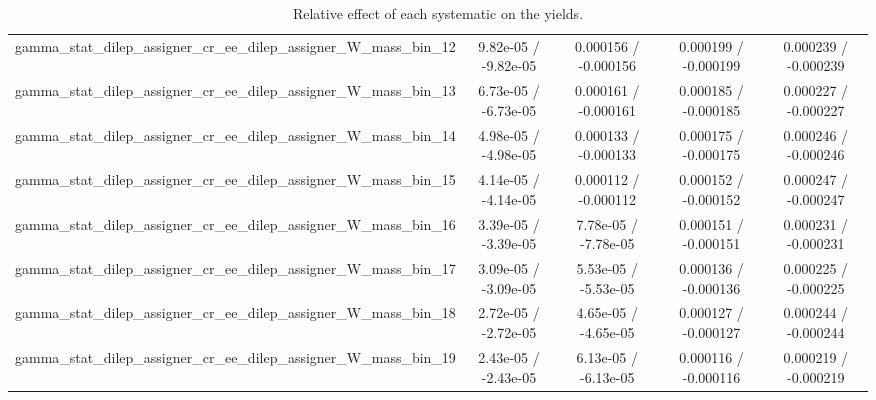 \documentclass[10pt]{article}
\begin{document}
\begin{table}[htbp]
\begin{center}
\begin{tabular}{|c|c|c|c|c|}
  gamma_stat_dilep_assigner_cr_ee_dilep_assigner_W_mass_bin_12 & 9.82e-05 / -9.82e-05 & 0.000156 / -0.000156 & 0.000199 / -0.000199 & 0.000239 / -0.000239 \\ 
  gamma_stat_dilep_assigner_cr_ee_dilep_assigner_W_mass_bin_13 & 6.73e-05 / -6.73e-05 & 0.000161 / -0.000161 & 0.000185 / -0.000185 & 0.000227 / -0.000227 \\ 
  gamma_stat_dilep_assigner_cr_ee_dilep_assigner_W_mass_bin_14 & 4.98e-05 / -4.98e-05 & 0.000133 / -0.000133 & 0.000175 / -0.000175 & 0.000246 / -0.000246 \\ 
  gamma_stat_dilep_assigner_cr_ee_dilep_assigner_W_mass_bin_15 & 4.14e-05 / -4.14e-05 & 0.000112 / -0.000112 & 0.000152 / -0.000152 & 0.000247 / -0.000247 \\ 
  gamma_stat_dilep_assigner_cr_ee_dilep_assigner_W_mass_bin_16 & 3.39e-05 / -3.39e-05 & 7.78e-05 / -7.78e-05 & 0.000151 / -0.000151 & 0.000231 / -0.000231 \\ 
  gamma_stat_dilep_assigner_cr_ee_dilep_assigner_W_mass_bin_17 & 3.09e-05 / -3.09e-05 & 5.53e-05 / -5.53e-05 & 0.000136 / -0.000136 & 0.000225 / -0.000225 \\ 
  gamma_stat_dilep_assigner_cr_ee_dilep_assigner_W_mass_bin_18 & 2.72e-05 / -2.72e-05 & 4.65e-05 / -4.65e-05 & 0.000127 / -0.000127 & 0.000244 / -0.000244 \\ 
  gamma_stat_dilep_assigner_cr_ee_dilep_assigner_W_mass_bin_19 & 2.43e-05 / -2.43e-05 & 6.13e-05 / -6.13e-05 & 0.000116 / -0.000116 & 0.000219 / -0.000219 \\ 
\hline 
\end{tabular} 
\caption{Relative effect of each systematic on the yields.} 
\end{center} 
\end{table} 
\end{document}
